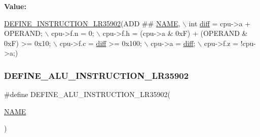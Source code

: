 {\bfseries Value\+:}
\begin{DoxyCode}
\mbox{\hyperlink{isa-lr35902_8c_a3128fc43c5d01e8b51f67901c0b4b5ef}{DEFINE\_INSTRUCTION\_LR35902}}(ADD ## \mbox{\hyperlink{inflate_8h_a164ea0159d5f0b5f12a646f25f99eceaa67bc2ced260a8e43805d2480a785d312}{NAME}}, \(\backslash\)
        \textcolor{keywordtype}{int} \mbox{\hyperlink{isa-lr35902_8c_a65f3a8178e1f997a7a19a988bb0f4e1a}{diff}} = cpu->a + OPERAND; \(\backslash\)
        cpu->f.n = 0; \(\backslash\)
        cpu->f.h = (cpu->a & 0xF) + (OPERAND & 0xF) >= 0x10; \(\backslash\)
        cpu->f.c = \mbox{\hyperlink{isa-lr35902_8c_a65f3a8178e1f997a7a19a988bb0f4e1a}{diff}} >= 0x100; \(\backslash\)
        cpu->a = \mbox{\hyperlink{isa-lr35902_8c_a65f3a8178e1f997a7a19a988bb0f4e1a}{diff}}; \(\backslash\)
        cpu->f.z = !cpu->a;)
\end{DoxyCode}
\mbox{\label{isa-lr35902_8c_a08c2ca1ec4fdaffa0f5d67d8330b76dd}} 
\subsubsection{\texorpdfstring{D\+E\+F\+I\+N\+E\+\_\+\+A\+L\+U\+\_\+\+I\+N\+S\+T\+R\+U\+C\+T\+I\+O\+N\+\_\+\+L\+R35902}{DEFINE\_ALU\_INSTRUCTION\_LR35902}}
{\footnotesize\ttfamily \#define D\+E\+F\+I\+N\+E\+\_\+\+A\+L\+U\+\_\+\+I\+N\+S\+T\+R\+U\+C\+T\+I\+O\+N\+\_\+\+L\+R35902(\begin{DoxyParamCaption}\item[{}]{\mbox{\hyperlink{inflate_8h_a164ea0159d5f0b5f12a646f25f99eceaa67bc2ced260a8e43805d2480a785d312}{N\+A\+ME}} }\end{DoxyParamCaption})}

